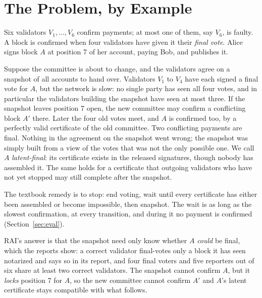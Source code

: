 \section{The Problem, by Example}
\label{sec:problem}
Six validators $V_1,\dots,V_6$ confirm payments; at most one of them, say $V_6$, is faulty. A block is confirmed when four validators have given it their \emph{final vote}. Alice signs block $A$ at position 7 of her account, paying Bob, and publishes it.

Suppose the committee is about to change, and the validators agree on a snapshot of all accounts to hand over. Validators $V_1$ to $V_4$ have each signed a final vote for $A$, but the network is slow: no single party has seen all four votes, and in particular the validators building the snapshot have seen at most three. If the snapshot leaves position 7 open, the new committee may confirm a conflicting block $A'$ there. Later the four old votes meet, and $A$ is confirmed too, by a perfectly valid certificate of the old committee. Two conflicting payments are final. Nothing in the agreement on the snapshot went wrong; the snapshot was simply built from a view of the votes that was not the only possible one. We call $A$ \emph{latent-final}: its certificate exists in the released signatures, though nobody has assembled it. The same holds for a certificate that outgoing validators who have not yet stopped may still complete after the snapshot.

The textbook remedy is to stop: end voting, wait until every certificate has either been assembled or become impossible, then snapshot. The wait is as long as the slowest confirmation, at every transition, and during it no payment is confirmed (Section~\ref{sec:eval}).

RAI's answer is that the snapshot need only know whether $A$ \emph{could} be final, which the reports show: a correct validator final-votes only a block it has seen notarized and says so in its report, and four final voters and five reporters out of six share at least two correct validators. The snapshot cannot confirm $A$, but it \emph{locks} position 7 for $A$, so the new committee cannot confirm $A'$ and $A$'s latent certificate stays compatible with what follows.
